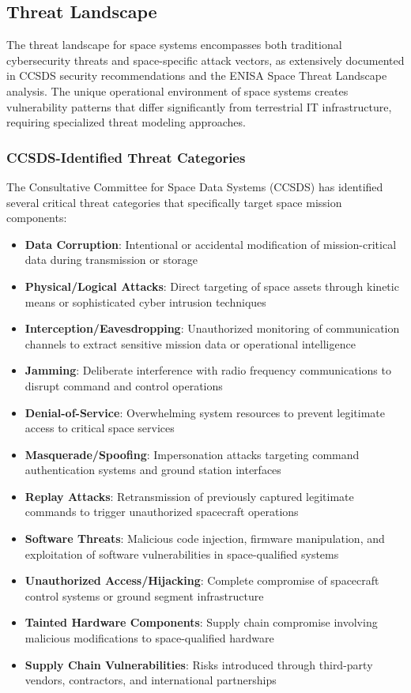 \documentclass[binding=0.6cm]{sapthesis}
\begin{document}
\subsection{Threat Landscape}

The threat landscape for space systems encompasses both traditional cybersecurity threats and space-specific attack vectors, as extensively documented in CCSDS security recommendations and the ENISA Space Threat Landscape analysis. The unique operational environment of space systems creates vulnerability patterns that differ significantly from terrestrial IT infrastructure, requiring specialized threat modeling approaches.

\subsubsection{CCSDS-Identified Threat Categories}

The Consultative Committee for Space Data Systems (CCSDS) has identified several critical threat categories that specifically target space mission components:

\begin{itemize}
    \item \textbf{Data Corruption}: Intentional or accidental modification of mission-critical data during transmission or storage
    \item \textbf{Physical/Logical Attacks}: Direct targeting of space assets through kinetic means or sophisticated cyber intrusion techniques
    \item \textbf{Interception/Eavesdropping}: Unauthorized monitoring of communication channels to extract sensitive mission data or operational intelligence
    \item \textbf{Jamming}: Deliberate interference with radio frequency communications to disrupt command and control operations
    \item \textbf{Denial-of-Service}: Overwhelming system resources to prevent legitimate access to critical space services
    \item \textbf{Masquerade/Spoofing}: Impersonation attacks targeting command authentication systems and ground station interfaces
    \item \textbf{Replay Attacks}: Retransmission of previously captured legitimate commands to trigger unauthorized spacecraft operations
    \item \textbf{Software Threats}: Malicious code injection, firmware manipulation, and exploitation of software vulnerabilities in space-qualified systems
    \item \textbf{Unauthorized Access/Hijacking}: Complete compromise of spacecraft control systems or ground segment infrastructure
    \item \textbf{Tainted Hardware Components}: Supply chain compromise involving malicious modifications to space-qualified hardware
    \item \textbf{Supply Chain Vulnerabilities}: Risks introduced through third-party vendors, contractors, and international partnerships
\end{itemize}
\end{document}

